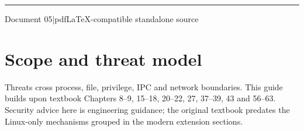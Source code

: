 \documentclass[11pt,letterpaper,oneside]{report}
\begin{document}
\hypersetup{pageanchor=false}%
\begin{titlepage}\centering{}\vspace{0.6cm}{\Large Threat modeling, privilege boundaries and defense in depth\par}\vspace{2cm}\rule{0.75\textwidth}{1.2pt}\par\vspace{0.55cm}{\large An original companion to Michael Kerrisk\textquotesingle s 2010 text}\par\vspace{0.3cm}{\large Edition 1.0\quad |\quad October 2026}\par\vfill{\small Document 05\quad |\quad pdfLaTeX-compatible standalone source}\par\end{titlepage}\hypersetup{pageanchor=true}
\tableofcontents\clearpage
\chapter{Scope and threat model}
Threats cross process, file, privilege, IPC and network boundaries. This guide builds upon textbook Chapters 8--9, 15--18, 20--22, 27, 37--39, 43 and 56--63. Security advice here is engineering guidance; the original textbook predates the Linux-only mechanisms grouped in the modern extension sections.
\end{document}
